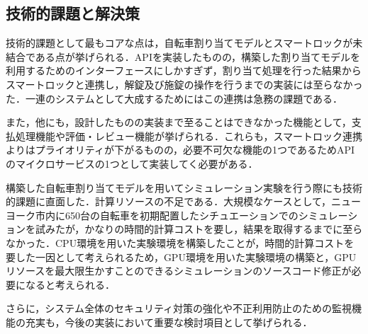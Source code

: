   \subsection{技術的課題と解決策}
    \label{sec:技術的課題と解決策}
      \par 技術的課題として最もコアな点は，自転車割り当てモデルとスマートロックが未結合である点が挙げられる．APIを実装したものの，構築した割り当てモデルを利用するためのインターフェースにしかすぎず，割り当て処理を行った結果からスマートロックと連携し，解錠及び施錠の操作を行うまでの実装には至らなかった．一連のシステムとして大成するためにはこの連携は急務の課題である．
      \par また，他にも，設計したものの実装まで至ることはできなかった機能として，支払処理機能や評価・レビュー機能が挙げられる．これらも，スマートロック連携よりはプライオリティが下がるものの，必要不可欠な機能の1つであるためAPIのマイクロサービスの1つとして実装してく必要がある．
      \par 構築した自転車割り当てモデルを用いてシミュレーション実験を行う際にも技術的課題に直面した．計算リソースの不足である．大規模なケースとして，ニューヨーク市内に650台の自転車を初期配置したシチュエーションでのシミュレーションを試みたが，かなりの時間的計算コストを要し，結果を取得するまでに至らなかった．CPU環境を用いた実験環境を構築したことが，時間的計算コストを要した一因として考えられるため，GPU環境を用いた実験環境の構築と，GPUリソースを最大限生かすことのできるシミュレーションのソースコード修正が必要になると考えられる．
      \par さらに，システム全体のセキュリティ対策の強化や不正利用防止のための監視機能の充実も，今後の実装において重要な検討項目として挙げられる．
      

